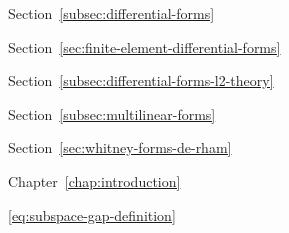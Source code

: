 \par\noindent\hspace*{1em}\label{index:form-differential}\quad Section~\ref{subsec:differential-forms}

\par\noindent\hspace*{2em}\label{index:form-differential-finite-element}\quad Section~\ref{sec:finite-element-differential-forms}

\par\noindent\hspace*{2em}\label{index:form-differential-l-2-theory}\quad Section~\ref{subsec:differential-forms-l2-theory}

\par\noindent\hspace*{1em}\label{index:form-multilinear}\quad Section~\ref{subsec:multilinear-forms}

\par\noindent\hspace*{1em}\label{index:form-whitney}\quad Section~\ref{sec:whitney-forms-de-rham}

\par\noindent\hspace*{0em}\label{index:galerkin-method}\quad Chapter~\ref{chap:introduction}

\par\noindent\hspace*{0em}\label{index:gap}\quad \eqref{eq:subspace-gap-definition}

\par\noindent\hspace*{0em}\label{index:grading}\quad \hyperref[index:vector-space-graded]{}

